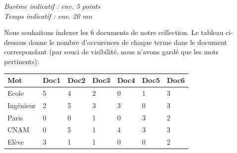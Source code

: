 \documentclass[9pt,a4paper]{article}
\begin{document}
{\it
Bar\^eme indicatif : env. 5 points\\
Temps indicatif : env. 20 mn\\
} 

Nous souhaitons indexer les 6 documents de notre collection.
Le tableau ci-dessous donne le nombre d'occurences de chaque terme dans le
document correspondant (par souci de visibilit\'e, nous n'avons gard\'e que les mots pertinents):\\
\begin{tabular}{*{7}{|l}|}
\hline
Mot	&Doc1	&Doc2	&Doc3	&Doc4	&Doc5	&Doc6\\
\hline
\hline
Ecole	&5	&4	&2	&0	&1	&3\\
\hline
Ing\'enieur	&2	&5	&3	&3	&0	&3\\
\hline
Paris	&0	&0	&1	&0	&3	&2\\
\hline
CNAM	&0	&5	&1	&4	&3	&3\\
\hline
El\`eve	&3	&1	&1	&0	&0	&2\\
\hline
\end{tabular}
\end{document}
